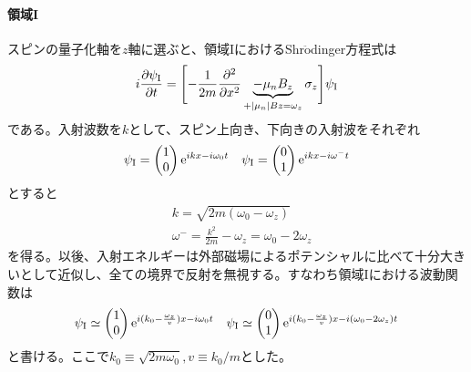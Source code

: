 \paragraph{領域I}
スピンの量子化軸を$z$軸に選ぶと、領域IにおけるShr$\ddot{\mathrm{o}}$dinger方程式は%
\begin{equation}
i\frac{\partial \psi_\mathrm{I}}{\partial t}= \Biggl[-\frac{1}{2m} \frac{\partial^2}{\partial x^2} \underbrace{-\mu_nB_z}_{+|\mu_n|Bz =\omega_z} \sigma_z\Biggr] \psi_\mathrm{I}
\end{equation}
である。入射波数を$k$として、スピン上向き、下向きの入射波をそれぞれ
\begin{align}
\psi_\mathrm{I}=\begin{pmatrix} 1\\0 \end{pmatrix} \mathrm{e}^{i k x -i\omega_0 t} && \psi_\mathrm{I}=\begin{pmatrix} 0\\1 \end{pmatrix} \mathrm{e}^{i k x -i\omega^- t}
\end{align}
とすると
\begin{align}
&k=\sqrt{2m(\omega_0-\omega_z)} \\
&\omega^-=\frac{k^2}{2m} -\omega_z=\omega_0-2\omega_z
\end{align}
を得る。以後、入射エネルギーは外部磁場によるポテンシャルに比べて十分大きいとして近似し、全ての境界で反射を無視する。すなわち領域Iにおける波動関数は
\begin{align}
\psi_\mathrm{I}\simeq \begin{pmatrix} 1\\0 \end{pmatrix} \mathrm{e}^{i (k_0-\frac{\omega_z}{v}) x -i\omega_0 t} && \psi_\mathrm{I}\simeq \begin{pmatrix} 0\\1 \end{pmatrix} \mathrm{e}^{i (k_0-\frac{\omega_z}{v}) x -i(\omega_0-2\omega_z) t}
\end{align}
と書ける。ここで$k_0 \equiv \sqrt{2m\omega_0},v \equiv k_0/m$とした。

